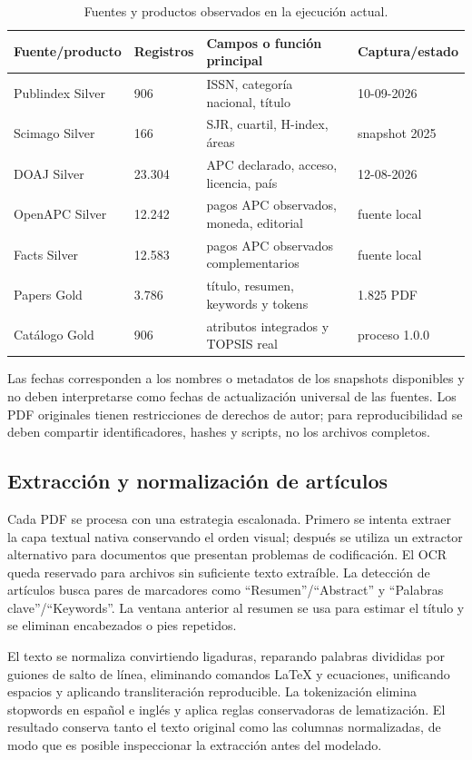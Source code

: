 \documentclass[12pt,a4paper]{article}
\begin{document}
\begin{table}[htbp]
\centering
\caption{Fuentes y productos observados en la ejecución actual.}
\label{tab:fuentes}
\small
\begin{tabular}{p{2.8cm}p{2.2cm}p{4.2cm}p{2.3cm}}
\toprule
Fuente/producto & Registros & Campos o función principal & Captura/estado \\
\midrule
Publindex Silver & 906 & ISSN, categoría nacional, título & 10-09-2026 \\
Scimago Silver & 166 & SJR, cuartil, H-index, áreas & snapshot 2025 \\
DOAJ Silver & 23.304 & APC declarado, acceso, licencia, país & 12-08-2026 \\
OpenAPC Silver & 12.242 & pagos APC observados, moneda, editorial & fuente local \\
Facts Silver & 12.583 & pagos APC observados complementarios & fuente local \\
Papers Gold & 3.786 & título, resumen, keywords y tokens & 1.825 PDF \\
Catálogo Gold & 906 & atributos integrados y TOPSIS real & proceso 1.0.0 \\
\bottomrule
\end{tabular}
\end{table}

Las fechas corresponden a los nombres o metadatos de los snapshots disponibles y no deben interpretarse como fechas de actualización universal de las fuentes. Los PDF originales tienen restricciones de derechos de autor; para reproducibilidad se deben compartir identificadores, hashes y scripts, no los archivos completos.

\subsection{Extracción y normalización de artículos}
Cada PDF se procesa con una estrategia escalonada. Primero se intenta extraer la capa textual nativa conservando el orden visual; después se utiliza un extractor alternativo para documentos que presentan problemas de codificación. El OCR queda reservado para archivos sin suficiente texto extraíble. La detección de artículos busca pares de marcadores como ``Resumen''/``Abstract'' y ``Palabras clave''/``Keywords''. La ventana anterior al resumen se usa para estimar el título y se eliminan encabezados o pies repetidos.

El texto se normaliza convirtiendo ligaduras, reparando palabras divididas por guiones de salto de línea, eliminando comandos LaTeX y ecuaciones, unificando espacios y aplicando transliteración reproducible. La tokenización elimina stopwords en español e inglés y aplica reglas conservadoras de lematización. El resultado conserva tanto el texto original como las columnas normalizadas, de modo que es posible inspeccionar la extracción antes del modelado.
\end{document}
